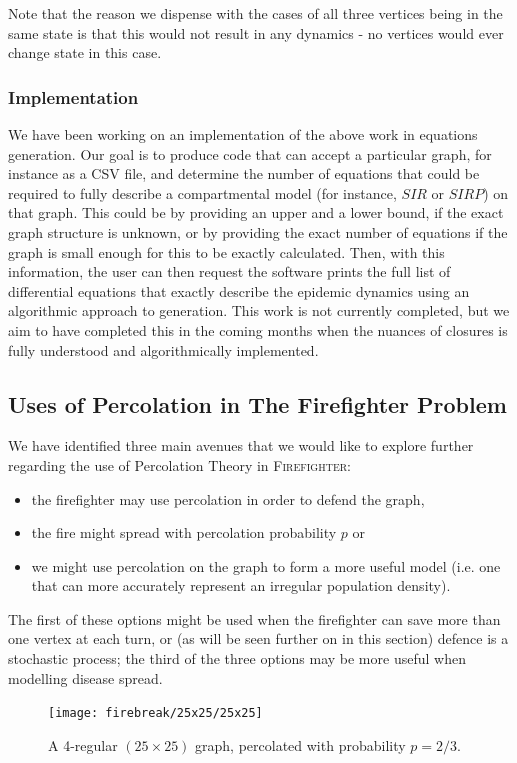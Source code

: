 \documentclass[../report.tex]{subfiles}
\begin{document}
Note that the reason we dispense with the cases of all three vertices being in the same state is that this would not result in any dynamics - no vertices would ever change state in this case. 

\subsubsection{Implementation}
\label{subsubsec:implementation}

We have been working on an implementation of the above work in equations generation. Our goal is to produce code that can accept a particular graph, for instance as a CSV file, and determine the number of equations that could be required to fully describe a compartmental model (for instance, $SIR$ or $SIRP$) on that graph. This could be by providing an upper and a lower bound, if the exact graph structure is unknown, or by providing the exact number of equations if the graph is small enough for this to be exactly calculated. Then, with this information, the user can then request the software prints the full list of differential equations that exactly describe the epidemic dynamics using an algorithmic approach to generation. This work is not currently completed, but we aim to have completed this in the coming months when the nuances of closures is fully understood and algorithmically implemented.

\subsection{Uses of Percolation in The Firefighter Problem}
\label{subsec:perc-fire}

We have identified three main avenues that we would like to explore further regarding the use of Percolation Theory in {\scshape Firefighter}: 
\begin{itemize}
	\item the firefighter may use percolation in order to defend the graph,
	\item the fire might spread with percolation probability $p$ or
	\item we might use percolation on the graph to form a more useful model (i.e. one that can more accurately represent an irregular population density).
\end{itemize}
The first of these options might be used when the firefighter can save more than one vertex at each turn, or (as will be seen further on in this section) defence is a stochastic process; the third of the three options may be more useful when modelling disease spread.
\begin{figure}[ht]
	\centering
		\texttt{[image: firebreak/25x25/25x25]}
	\caption{A 4-regular $(25\times25)$ graph, percolated with probability $p=2/3$.}
	\label{fig:largeperc}
\end{figure}
\end{document}
